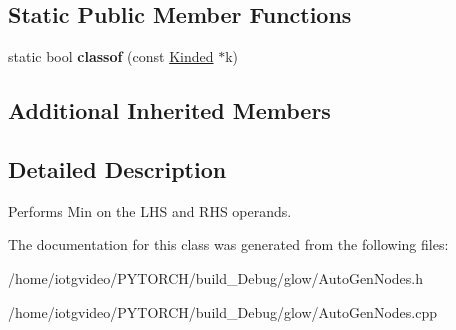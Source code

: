 \subsection*{Static Public Member Functions}
\begin{DoxyCompactItemize}
\item 
\mbox{\label{classglow_1_1_min_node_a442c2a93590e93890a5538b767ec4f59}} 
static bool {\bfseries classof} (const \hyperlink{classglow_1_1_kinded}{Kinded} $\ast$k)
\end{DoxyCompactItemize}
\subsection*{Additional Inherited Members}


\subsection{Detailed Description}
Performs Min on the L\+HS and R\+HS operands. 

The documentation for this class was generated from the following files\+:\begin{DoxyCompactItemize}
\item 
/home/iotgvideo/\+P\+Y\+T\+O\+R\+C\+H/build\+\_\+\+Debug/glow/Auto\+Gen\+Nodes.\+h\item 
/home/iotgvideo/\+P\+Y\+T\+O\+R\+C\+H/build\+\_\+\+Debug/glow/Auto\+Gen\+Nodes.\+cpp\end{DoxyCompactItemize}
